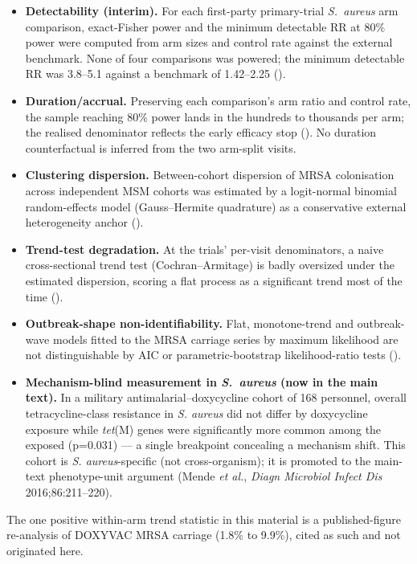 \documentclass[11pt,a4paper]{article}
\newcommand{\sa}{\emph{S.~aureus}}
\begin{document}
\begin{itemize}
\item \textbf{Detectability (interim).} For each first-party primary-trial \sa{}
arm comparison, exact-Fisher power and the minimum detectable RR at 80\% power
were computed from arm sizes and control rate against the external benchmark. None
of four comparisons was powered; the minimum detectable RR was 3.8--5.1 against a
benchmark of 1.42--2.25 ().
\item \textbf{Duration/accrual.} Preserving each comparison's arm ratio and
control rate, the sample reaching 80\% power lands in the hundreds to thousands per
arm; the realised denominator reflects the early efficacy stop
(). No duration counterfactual is inferred from
the two arm-split visits.
\item \textbf{Clustering dispersion.} Between-cohort dispersion of MRSA
colonisation across independent MSM cohorts was estimated by a logit-normal
binomial random-effects model (Gauss--Hermite quadrature) as a conservative
external heterogeneity anchor ().
\item \textbf{Trend-test degradation.} At the trials' per-visit denominators, a
naive cross-sectional trend test (Cochran--Armitage) is badly oversized under the
estimated dispersion, scoring a flat process as a significant trend most of the
time ().
\item \textbf{Outbreak-shape non-identifiability.} Flat, monotone-trend and
outbreak-wave models fitted to the MRSA carriage series by maximum likelihood are
not distinguishable by AIC or parametric-bootstrap likelihood-ratio tests
().
\item \textbf{Mechanism-blind measurement in \sa{} (now in the main text).} In a
military antimalarial--doxycycline cohort of 168 personnel, overall
tetracycline-class resistance in \emph{S. aureus} did not differ by doxycycline
exposure while \emph{tet}(M) genes were significantly more common among the
exposed (p=0.031) --- a single breakpoint concealing a mechanism shift. This
cohort is \emph{S. aureus}-specific (not cross-organism); it is promoted to the
main-text phenotype-unit argument (Mende \textit{et al.}, \textit{Diagn Microbiol
Infect Dis} 2016;86:211--220).
\end{itemize}

The one positive within-arm trend statistic in this material is a published-figure
re-analysis of DOXYVAC MRSA carriage (1.8\% to 9.9\%), cited as such and not
originated here.
\end{document}
